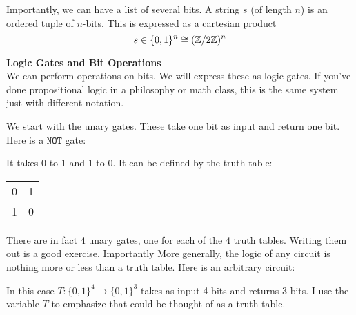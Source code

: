 \documentclass[12pt,twoside]{reedthesis}
\theoremstyle{definition}\newtheorem{definition}{Definition}
\begin{document}
Importantly, we can have a list of several bits. A string $s$ (of length $n$) is an ordered tuple of $n$-bits. This is expressed as a cartesian product
\[
    s \in \{0, 1\}^n \cong (\mathbb{Z}/2\mathbb{Z})^n
\]


\textbf{Logic Gates and Bit Operations} \\
We can perform operations on bits. We will express these as logic gates. If you've done propositional logic in a philosophy or math class, this is the same system just with different notation.

We start with the unary gates. These take one bit as input and return one bit. Here is a $\texttt{NOT}$ gate:
\begin{center}
    
\end{center}

It takes 0 to 1 and 1 to 0. It can be defined by the truth table:
\begin{tabular}{l|l}
0 & 1 \\
1 & 0
\end{tabular}

There are in fact 4 unary gates, one for each of the 4 truth tables. Writing them out is a good exercise. Importantly More generally, the logic of any circuit is nothing more or less than a truth table. Here is an arbitrary circuit:
\begin{center}
    \hspace{12mm}
\end{center}
In this case $T : \{0,1\}^4 \rightarrow \{0,1\}^3$ takes as input 4 bits and returns 3 bits. I use the variable $T$ to emphasize that could be thought of as a truth table.
\end{document}
